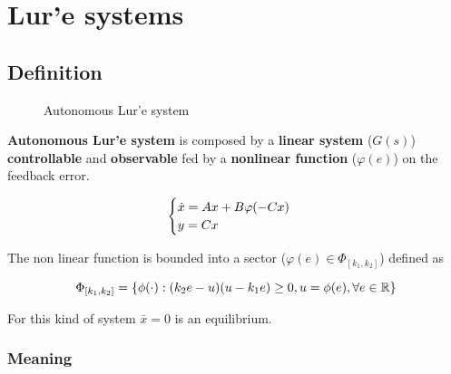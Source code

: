 \chapter{Lur'e systems}

\section{Definition}

\begin{figure}[htb]
    \centering
    \caption{Autonomous Lur'e system}
    \label{fig:lure-system}
\end{figure}

\textbf{Autonomous Lur'e system} is composed by a \textbf{linear system} ($G(s)$) \textbf{controllable} and \textbf{observable} fed by a \textbf{nonlinear function} ($\varphi(e)$) on the feedback error.

\[
    \begin{cases}
        \dot{x} = A x + B \varphi(-Cx) \\
        y = C x
    \end{cases}
\]

The non linear function is bounded into a sector ($\varphi(e) \in \Phi_{[k_1,k_2]}$) defined as

\[
    \Phi_{[k_1,k_2]} = \{\phi(\cdot) : (k_2 e -u)(u - k_1 e) \geq 0, u=\phi(e), \forall e \in \mathbb{R} \}
\]

For this kind of system $\bar{x} = 0$ is an equilibrium.

\subsection{Meaning}

